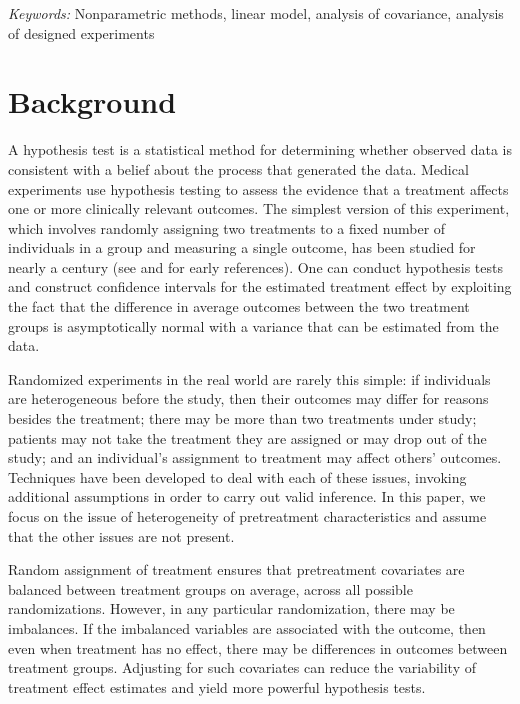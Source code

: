 \documentclass[12pt]{article}
\begin{document}
\noindent%
{\it Keywords:}  Nonparametric methods, linear model, analysis of covariance, analysis of designed experiments
\vfill

\newpage
{} %
\section{Background}
A hypothesis test is a statistical method for determining whether observed data is consistent with a belief about the process that generated the data.
Medical experiments use hypothesis testing to assess the evidence that a treatment affects one or more clinically relevant outcomes.
The simplest version of this experiment, which involves randomly assigning two treatments to a fixed number of individuals in a group and measuring a single outcome, has been studied for nearly a century (see \cite{fisher_design_1935} and \cite{neyman_application_1923} for early references).
One can conduct hypothesis tests and construct confidence intervals for the estimated treatment effect
by exploiting the fact that the difference in average outcomes between the two treatment groups is asymptotically normal with a variance that can be estimated from the data.

Randomized experiments in the real world are rarely this simple:
if individuals are heterogeneous before the study, then their outcomes may differ for reasons besides the treatment;
there may be more than two treatments under study;
patients may not take the treatment they are assigned or may drop out of the study;
and an individual's assignment to treatment may affect others' outcomes.
Techniques have been developed to deal with each of these issues, invoking additional assumptions in order to carry out valid inference.
In this paper, we focus on the issue of heterogeneity of pretreatment characteristics and assume that the other issues are not present.

Random assignment of treatment ensures that pretreatment covariates are balanced between treatment groups on average, across all possible randomizations.
However, in any particular randomization, there may be imbalances.
If the imbalanced variables are associated with the outcome, then even when treatment has no effect, there may be differences in outcomes between treatment groups.
Adjusting for such covariates can reduce the variability of treatment effect estimates and yield more powerful hypothesis tests.
\end{document}
